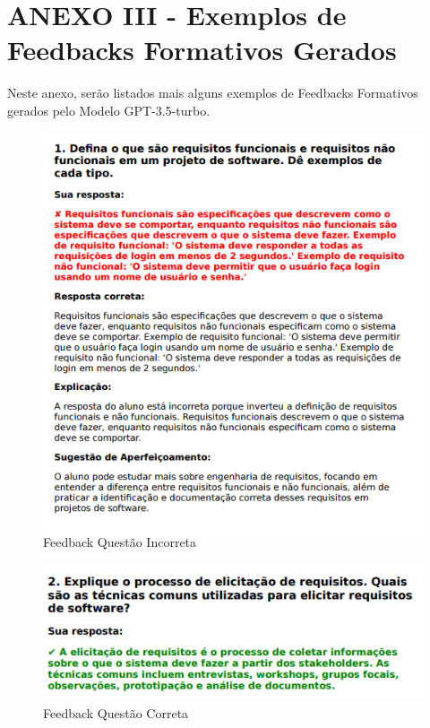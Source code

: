 \chapter*{ANEXO III - Exemplos de Feedbacks Formativos Gerados}
\label{anexoIIIEFFG}

Neste anexo, serão listados mais alguns exemplos de Feedbacks Formativos gerados pelo Modelo GPT-3.5-turbo.

\begin{figure}[H]
    \centering
    \includegraphics[width=1\textwidth]{figuras/feedback_1.png}
    \caption{Feedback Questão Incorreta}
    \label{fig:report_questions}
\end{figure}

\begin{figure}[H]
    \centering
    \includegraphics[width=1\textwidth]{figuras/feedback_2.png}
    \caption{Feedback Questão Correta}
    \label{fig:report_questions}
\end{figure}

